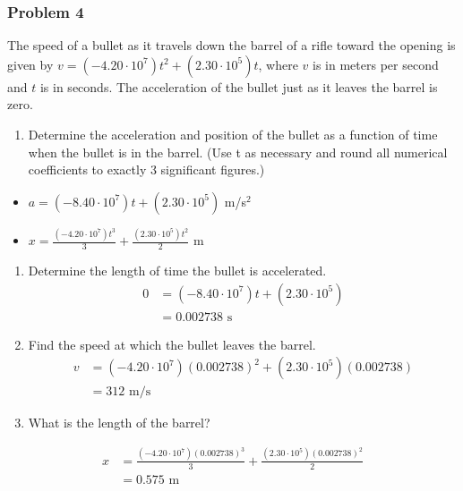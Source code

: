 \documentclass[
  letterpaper,
  DIV=11,
  numbers=noendperiod]{scrartcl}
\providecommand{\tightlist}{%
  \setlength{\itemsep}{0pt}\setlength{\parskip}{0pt}}\usepackage{longtable,booktabs,array}
\begin{document}
\hypertarget{problem-4-3}{%
\subsubsection{Problem 4}\label{problem-4-3}}

The speed of a bullet as it travels down the barrel of a rifle toward
the opening is given by
\(v = (-4.20 \cdot 10^7) t^2 + (2.30 \cdot 10^5) t\), where \(v\) is in
meters per second and \(t\) is in seconds. The acceleration of the
bullet just as it leaves the barrel is zero.

\begin{enumerate}
\def\labelenumi{(\alph{enumi})}
\tightlist
\item
  Determine the acceleration and position of the bullet as a function of
  time when the bullet is in the barrel. (Use t as necessary and round
  all numerical coefficients to exactly 3 significant figures.)
\end{enumerate}

\begin{itemize}
\tightlist
\item
  \(a = \left(-8.40\cdot 10^7\right)t+\left(2.30\cdot 10^5\right)\)
  m/s\(^2\)
\item
  \(x = \frac{\left(-4.20\cdot 10^7\right)t^3}{3}+\frac{\left(2.30\cdot 10^5\right)t^2}{2}\)
  m
\end{itemize}

\begin{enumerate}
\def\labelenumi{(\alph{enumi})}
\setcounter{enumi}{1}
\item
  Determine the length of time the bullet is accelerated. \begin{align*}
  0 &= \left(-8.40\cdot 10^7\right)t+\left(2.30\cdot 10^5\right) \\
    &= 0.002738 \text{ s}
  \end{align*}
\item
  Find the speed at which the bullet leaves the barrel. \begin{align*}
  v &= \left(-4.20\cdot 10^7\right)(0.002738)^2+\left(2.30\cdot 10^5\right)(0.002738) \\
  &= 312 \text{ m/s}
  \end{align*}
\item
  What is the length of the barrel?
\end{enumerate}

\begin{align*}
x &= \frac{\left(-4.20\cdot 10^7\right)(0.002738)^3}{3}+\frac{\left(2.30\cdot 10^5\right)(0.002738)^2}{2} \\
&= 0.575 \text{ m}
\end{align*}
\end{document}

